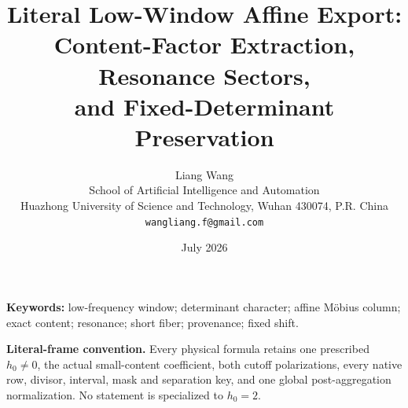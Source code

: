 \documentclass[11pt]{article}
\title{\textbf{Literal Low-Window Affine Export:}\\
Content-Factor Extraction, Resonance Sectors,\\
and Fixed-Determinant Preservation}
\author{Liang Wang\\
School of Artificial Intelligence and Automation\\
Huazhong University of Science and Technology, Wuhan 430074, P.R. China\\
\texttt{wangliang.f@gmail.com}}
\date{July 2026}
\theoremstyle{definition}
\theoremstyle{remark}
\begin{document}
\maketitle



\noindent\textbf{Keywords:}
low-frequency window; determinant character; affine M\"obius column;
exact content; resonance; short fiber; provenance; fixed shift.

\medskip
\noindent\textbf{Literal-frame convention.}
Every physical formula retains one prescribed \(h_0\ne0\), the
actual small-content coefficient, both cutoff polarizations, every
native row, divisor, interval, mask and separation key, and one global
post-aggregation normalization.  No statement is specialized to
\(h_0=2\).










\begingroup
\footnotesize
\raggedright


\endgroup
\end{document}
